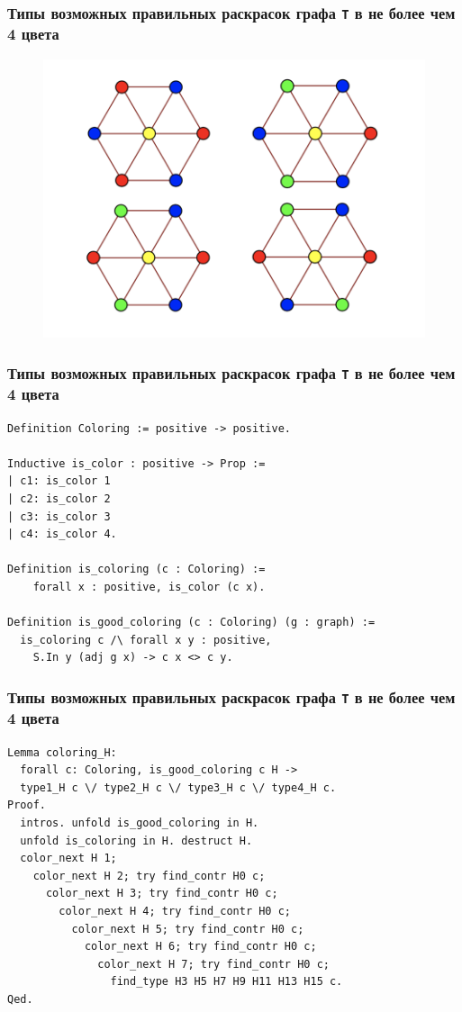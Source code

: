 \documentclass[14pt]{beamer}
\begin{document}
\begin{frame}
\frametitle{Типы возможных правильных раскрасок графа {\tt T} в не более чем 4 цвета}
\begin{figure}[H]
  \center
  \includegraphics[width=0.75\linewidth]{Colorings_of_H.png}
\end{figure}
\end{frame}


\begin{frame}[fragile]
\frametitle{Типы возможных правильных раскрасок графа {\tt T} в не более чем 4 цвета}
{\footnotesize
\begin{verbatim}
Definition Coloring := positive -> positive.

Inductive is_color : positive -> Prop :=
| c1: is_color 1
| c2: is_color 2
| c3: is_color 3
| c4: is_color 4.

Definition is_coloring (c : Coloring) :=
    forall x : positive, is_color (c x).

Definition is_good_coloring (c : Coloring) (g : graph) :=
  is_coloring c /\ forall x y : positive, 
    S.In y (adj g x) -> c x <> c y.
\end{verbatim}
}
\end{frame}

\begin{frame}[fragile]
\frametitle{Типы возможных правильных раскрасок графа {\tt T} в не более чем 4 цвета}
{\footnotesize
\begin{verbatim}
Lemma coloring_H:
  forall c: Coloring, is_good_coloring c H ->
  type1_H c \/ type2_H c \/ type3_H c \/ type4_H c.
Proof.
  intros. unfold is_good_coloring in H. 
  unfold is_coloring in H. destruct H.
  color_next H 1;
    color_next H 2; try find_contr H0 c;
      color_next H 3; try find_contr H0 c;
        color_next H 4; try find_contr H0 c;
          color_next H 5; try find_contr H0 c;
            color_next H 6; try find_contr H0 c;
              color_next H 7; try find_contr H0 c;
                find_type H3 H5 H7 H9 H11 H13 H15 c.
Qed.
\end{verbatim} }
\end{frame}
\end{document}
